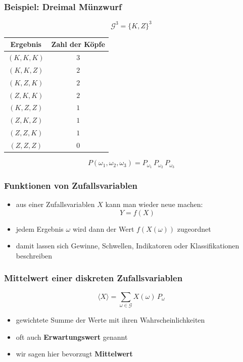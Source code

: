 \documentclass[aspectratio=169,professionalfonts]{beamer}
\begin{document}
\begin{frame}
  \frametitle{Beispiel: Dreimal Münzwurf}

  \[
    \mathcal G^3=\{K,Z\}^3
  \]

  \begin{center}
    \begin{tabular}{c c}
      Ergebnis & Zahl der K\"opfe \\
      \hline
      \((K,K,K)\) & \(3\) \\
      \((K,K,Z)\) & \(2\) \\
      \((K,Z,K)\) & \(2\) \\
      \((Z,K,K)\) & \(2\) \\
      \((K,Z,Z)\) & \(1\) \\
      \((Z,K,Z)\) & \(1\) \\
      \((Z,Z,K)\) & \(1\) \\
      \((Z,Z,Z)\) & \(0\)
    \end{tabular}
  \end{center}

  \vspace{0.2cm}

  \[
    P(\omega_1,\omega_2,\omega_3)=P_{\omega_1}\,P_{\omega_2}\,P_{\omega_3}
  \]
\end{frame}

\begin{frame}
  \frametitle{Funktionen von Zufallsvariablen}

  \begin{itemize}
    \item aus einer Zufallsvariablen \(X\) kann man wieder neue machen:
    \[
      Y=f(X)
    \]
    \item jedem Ergebnis \(\omega\) wird dann der Wert \(f(X(\omega))\) zugeordnet
    \item damit lassen sich Gewinne, Schwellen, Indikatoren oder Klassifikationen beschreiben
  \end{itemize}
\end{frame}

\begin{frame}
  \frametitle{Mittelwert einer diskreten Zufallsvariablen}

  \[
    \langle X\rangle=\sum_{\omega\in\mathcal G} X(\omega)\,P_\omega
  \]

  \vspace{0.35cm}

  \begin{itemize}
    \item gewichtete Summe der Werte mit ihren Wahrscheinlichkeiten
    \item oft auch \textbf{Erwartungswert} genannt
    \item wir sagen hier bevorzugt \textbf{Mittelwert}
  \end{itemize}
\end{frame}
\end{document}
